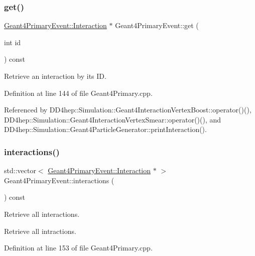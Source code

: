 \subsubsection{\texorpdfstring{get()}{get()}}
{\footnotesize\ttfamily \hyperlink{class_d_d4hep_1_1_simulation_1_1_geant4_primary_event_afe42410b9331b521808a49120f402bd9}{Geant4\+Primary\+Event\+::\+Interaction} $\ast$ Geant4\+Primary\+Event\+::get (\begin{DoxyParamCaption}\item[{int}]{id }\end{DoxyParamCaption}) const}



Retrieve an interaction by it\textquotesingle{}s ID. 



Definition at line 144 of file Geant4\+Primary.\+cpp.



Referenced by D\+D4hep\+::\+Simulation\+::\+Geant4\+Interaction\+Vertex\+Boost\+::operator()(), D\+D4hep\+::\+Simulation\+::\+Geant4\+Interaction\+Vertex\+Smear\+::operator()(), and D\+D4hep\+::\+Simulation\+::\+Geant4\+Particle\+Generator\+::print\+Interaction().

\hypertarget{class_d_d4hep_1_1_simulation_1_1_geant4_primary_event_affa234ba961fcfd0c48d5b352c2a5e00}{}\label{class_d_d4hep_1_1_simulation_1_1_geant4_primary_event_affa234ba961fcfd0c48d5b352c2a5e00} 
\subsubsection{\texorpdfstring{interactions()}{interactions()}}
{\footnotesize\ttfamily std\+::vector$<$ \hyperlink{class_d_d4hep_1_1_simulation_1_1_geant4_primary_event_afe42410b9331b521808a49120f402bd9}{Geant4\+Primary\+Event\+::\+Interaction} $\ast$ $>$ Geant4\+Primary\+Event\+::interactions (\begin{DoxyParamCaption}{ }\end{DoxyParamCaption}) const}



Retrieve all interactions. 

Retrieve all intractions. 

Definition at line 153 of file Geant4\+Primary.\+cpp.



